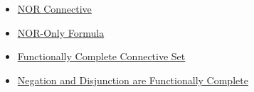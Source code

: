 \begin{dependencies}
\begin{itemize}
  \item \hyperref[def:nor-connective-propositional-logic]{NOR Connective}
  \item \hyperref[def:nor-only-formula-propositional-logic]{NOR-Only Formula}
  \item \hyperref[def:functionally-complete-connective-set-propositional-logic]{Functionally Complete Connective Set}
  \item \hyperref[thm:negation-disjunction-functionally-complete-propositional-logic]{Negation and Disjunction are Functionally Complete}
\end{itemize}
\end{dependencies}
